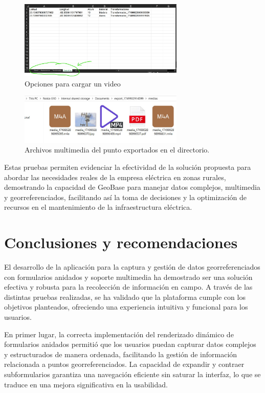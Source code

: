 \documentclass[12pt, a4paper]{book}
\begin{document}
\begin{figure}[H]
  \centering
  \includegraphics[width=0.7\textwidth]{images/functionality_test/excel.jpg}
  \caption{Opciones para cargar un video}
  \label{fig:excel}
\end{figure}

\begin{figure}[H]
  \centering
  \includegraphics[width=0.7\textwidth]{images/functionality_test/folder_medias.jpg}
  \caption{Archivos multimedia del punto exportados en el directorio.}
  \label{fig:foldermedias}
\end{figure}

Estas pruebas permiten evidenciar la efectividad de la solución propuesta para abordar las necesidades reales de la empresa eléctrica en zonas rurales, demostrando la capacidad de GeoBase para manejar datos complejos, multimedia y georreferenciados, facilitando así la toma de decisiones y la optimización de recursos en el mantenimiento de la infraestructura eléctrica.

\chapter{Conclusiones y recomendaciones}

El desarrollo de la aplicación para la captura y gestión de datos georreferenciados con formularios anidados y soporte multimedia ha demostrado ser una solución efectiva y robusta para la recolección de información en campo. A través de las distintas pruebas realizadas, se ha validado que la plataforma cumple con los objetivos planteados, ofreciendo una experiencia intuitiva y funcional para los usuarios.

En primer lugar, la correcta implementación del renderizado dinámico de formularios anidados permitió que los usuarios puedan capturar datos complejos y estructurados de manera ordenada, facilitando la gestión de información relacionada a puntos georreferenciados. La capacidad de expandir y contraer subformularios garantiza una navegación eficiente sin saturar la interfaz, lo que se traduce en una mejora significativa en la usabilidad.
\end{document}
